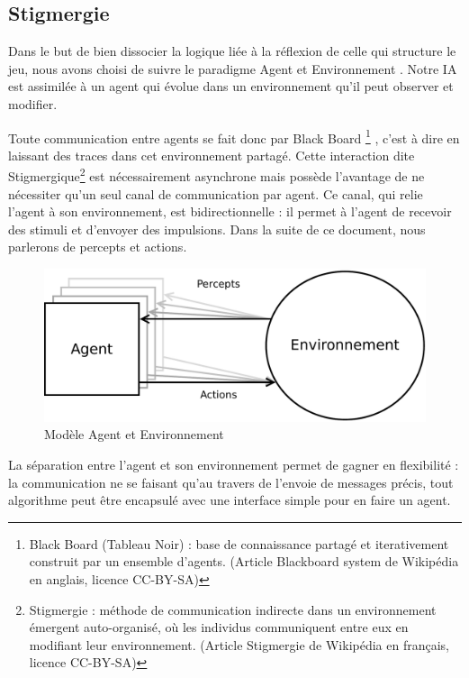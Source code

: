 \subsection{ \og Stigmergie \fg{} }

Dans le but de bien dissocier la logique liée à la réflexion de celle qui structure le jeu, nous avons choisi de suivre le paradigme \og Agent et Environnement \fg{}. Notre IA est assimilée à un agent qui évolue dans un environnement qu'il peut observer et modifier.

Toute communication entre agents se fait donc par \og Black Board \footnote{ \og Black Board \fg{} (Tableau Noir) : base de connaissance partagé et iterativement construit par un ensemble d'agents. (Article \og Blackboard system \fg{} de Wikipédia en anglais, licence CC-BY-SA)} \fg{}, c'est à dire en laissant des traces dans cet environnement partagé. Cette interaction dite \og Stigmergique\footnote{\og Stigmergie \fg{} : méthode de communication indirecte dans un environnement émergent auto-organisé, où les individus communiquent entre eux en modifiant leur environnement. (Article \og Stigmergie \fg{} de Wikipédia en français, licence CC-BY-SA)} \fg{} est nécessairement asynchrone mais possède l'avantage de ne nécessiter qu'un seul canal de communication par agent. Ce canal, qui relie l'agent à son environnement, est bidirectionnelle : il permet à l'agent de recevoir des stimuli et d'envoyer des impulsions. Dans la suite de ce document, nous parlerons de \og percepts\fg{} et \og actions\fg{}.

\begin{figure}[H] 
\centering
\includegraphics[width=\textwidth]{files/env/agent_env} 
\caption{Modèle \og Agent et Environnement \fg{}} 
\label{agent_env}
\end{figure}

La séparation entre l'agent et son environnement permet de gagner en flexibilité : la communication ne se faisant qu'au travers de l'envoie de messages précis, tout algorithme peut être encapsulé avec une interface simple pour en faire un agent.

